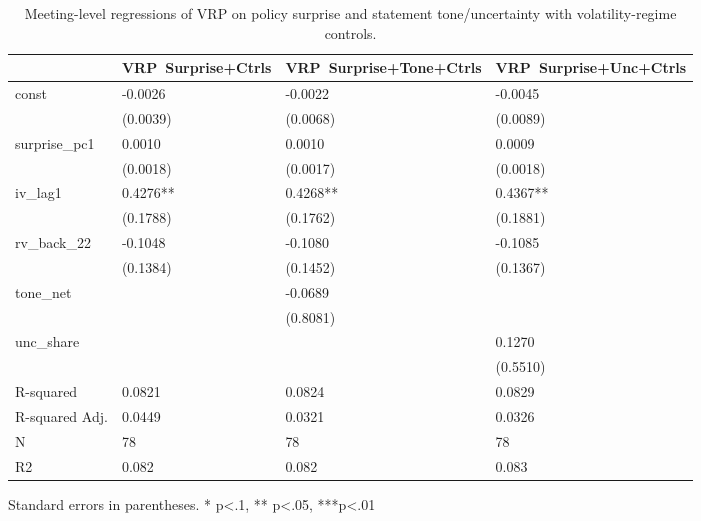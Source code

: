 \begin{table}
\caption{Meeting-level regressions of VRP on policy surprise and statement tone/uncertainty with volatility-regime controls.}
\label{tab:meet_vrp_controls}
\begin{center}
\begin{tabular}{llll}
\hline
               & VRP~Surprise+Ctrls & VRP~Surprise+Tone+Ctrls & VRP~Surprise+Unc+Ctrls  \\
\hline
const          & -0.0026            & -0.0022                 & -0.0045                 \\
               & (0.0039)           & (0.0068)                & (0.0089)                \\
surprise\_pc1  & 0.0010             & 0.0010                  & 0.0009                  \\
               & (0.0018)           & (0.0017)                & (0.0018)                \\
iv\_lag1       & 0.4276**           & 0.4268**                & 0.4367**                \\
               & (0.1788)           & (0.1762)                & (0.1881)                \\
rv\_back\_22   & -0.1048            & -0.1080                 & -0.1085                 \\
               & (0.1384)           & (0.1452)                & (0.1367)                \\
tone\_net      &                    & -0.0689                 &                         \\
               &                    & (0.8081)                &                         \\
unc\_share     &                    &                         & 0.1270                  \\
               &                    &                         & (0.5510)                \\
R-squared      & 0.0821             & 0.0824                  & 0.0829                  \\
R-squared Adj. & 0.0449             & 0.0321                  & 0.0326                  \\
N              & 78                 & 78                      & 78                      \\
R2             & 0.082              & 0.082                   & 0.083                   \\
\hline
\end{tabular}
\end{center}
\end{table}
\bigskip
Standard errors in parentheses. \newline 
* p<.1, ** p<.05, ***p<.01